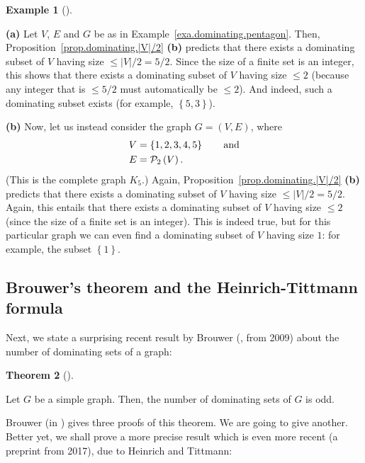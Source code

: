 \documentclass[numbers=enddot,12pt,final,onecolumn,notitlepage]{scrartcl}%
\theoremstyle{definition}
\newtheorem{theo}{Theorem}[subsection]
\newenvironment{theorem}[1][]
{\begin{theo}[#1]\begin{leftbar}}
{\end{leftbar}\end{theo}}
\newtheorem{exam}[theo]{Example}
\newenvironment{example}[1][]
{\begin{exam}[#1]\begin{leftbar}}
{\end{leftbar}\end{exam}}
\newcommand{\powset}[2][]{\ifthenelse{\equal{#2}{}}{\mathcal{P}\left(#1\right)}{\mathcal{P}_{#1}\left(#2\right)}}
\newcommand{\set}[1]{\left\{ #1 \right\}}
\newcommand{\abs}[1]{\left| #1 \right|}
\newcommand{\tup}[1]{\left( #1 \right)}
\begin{document}
\begin{example}
\textbf{(a)} Let $V$, $E$ and $G$ be as in
Example~\ref{exa.dominating.pentagon}.
Then, Proposition~\ref{prop.dominating.|V|/2} \textbf{(b)} predicts
that there exists a dominating subset of $V$ having size
$\leq \abs{V}/2 = 5/2$. Since the size of a finite set is an integer,
this shows that there exists a dominating subset of $V$ having size
$\leq 2$ (because any integer that is $\leq 5/2$ must automatically be
$\leq 2$). And indeed, such a dominating subset exists
(for example, $\set{5, 3}$).

\textbf{(b)} Now, let us instead consider the graph $G = \tup{V, E}$,
where
\begin{align*}
V &= \set{1, 2, 3, 4, 5} \qquad \text{and} \\
E &= \powset[2]{V} .
\end{align*}
(This is the complete graph $K_5$.)
Again, Proposition~\ref{prop.dominating.|V|/2} \textbf{(b)} predicts
that there exists a dominating subset of $V$ having size
$\leq \abs{V}/2 = 5/2$. Again, this entails that
there exists a dominating subset of $V$ having size $\leq 2$ (since
the size of a finite set is an integer). This is indeed true, but for
this particular graph we can even find a dominating subset of $V$
having size $1$: for example, the subset $\set{1}$.
\end{example}

\subsection{\label{subsect.dominating.odd}Brouwer's theorem and the
Heinrich-Tittmann formula}

Next, we state a surprising recent result by Brouwer (\cite{Brouwe09},
from 2009) about the number of dominating sets of a graph:

\begin{theorem} \label{thm.dominating.brouwer}
Let $G$ be a simple graph. Then, the number of dominating sets of $G$
is odd.
\end{theorem}

Brouwer (in \cite{Brouwe09}) gives three proofs of this theorem. We
are going to give another. Better yet, we shall prove a more
precise result which is even more recent (a preprint \cite{HeiTit17}
from 2017), due to Heinrich and Tittmann:
\end{document}
